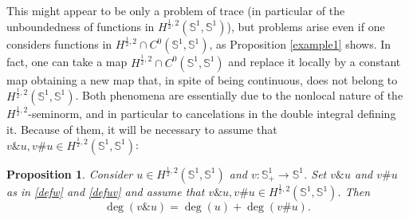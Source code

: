 \documentclass[12pt, a4paper]{article}
\newtheorem{prop}[thm]{Proposition}
\newcommand{\sph}{\mathbb{S}}
\renewcommand{\(}{\left(}
\renewcommand{\)}{\right)}
\begin{document}
This might appear to be only a problem of trace (in particular of the unboundedness of functions in $H^{\frac12,2}(\sph^1,\sph^1)$), but problems arise even if one considers functions in $H^{\frac12,2}\cap C^0(\sph^1,\sph^1)$, as Proposition \ref{example1} shows. In fact, one can take a map $H^{\frac12,2}\cap C^0(\sph^1,\sph^1)$ and replace it locally by a constant map obtaining a new map that, in spite of being continuous, does not belong to $H^{\frac12,2}(\sph^1,\sph^1)$.  Both phenomena are essentially due to the nonlocal nature of the $H^{\frac12,2}$-seminorm, and in particular to cancelations in the double integral defining it. Because of them, it will be necessary to assume that $v\&u, v\#u\in H^{\frac12,2}(\sph^1,\sph^1)$:

\begin{prop}\label{p:degjump} Consider $u \in H^{\frac{1}{2},2}(\sph^1,\sph^1)$ and $v:\sph^1_+\to \sph^1$. Set $v\&u$ and $v\#u$ as in \eqref{defw} and \eqref{defuv} and assume that $v\&u, v\#u\in H^{\frac{1}{2},2}(\sph^1,\sph^1)$. Then
\begin{equation}\label{eq:jump}
\deg(v\&u)= \deg(u)+\deg (v\#u).
\end{equation}
\end{prop}
\end{document}
